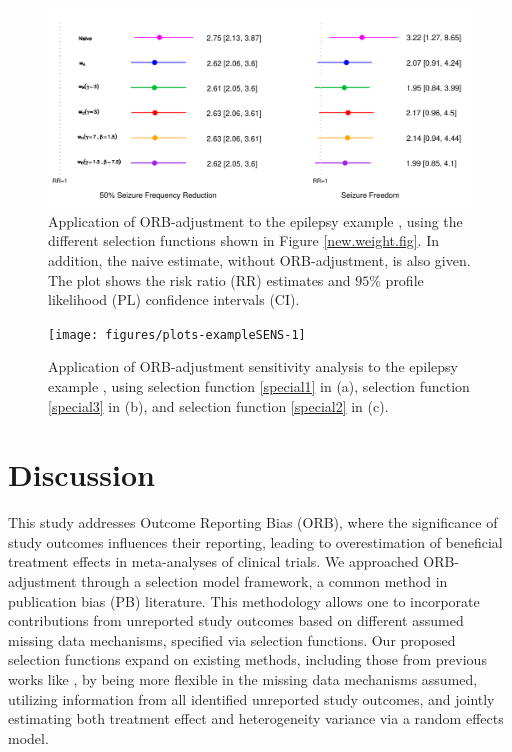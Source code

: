 \documentclass[twocolumn]{article}\usepackage[]{graphicx}\usepackage[]{xcolor}
\makeatletter
\def\maxwidth{ %
  \ifdim\Gin@nat@width>\linewidth
    \linewidth
  \else
    \Gin@nat@width
  \fi
}
\makeatother
\begin{document}
\begin{figure}[!hbt]
\centering
\caption{Application of ORB-adjustment to the epilepsy example \citep{Copas2019, topiramate}, using the different selection functions shown in Figure \ref{new.weight.fig}. In addition, the naive estimate, without ORB-adjustment, is also given. The plot shows the risk ratio (RR) estimates and $95\%$ profile likelihood (PL) confidence intervals (CI).}


{\centering \includegraphics[width=\maxwidth]{figures/plots-example-1} 

}



\label{example}
\end{figure}


\begin{figure}[!hbt]
\centering
\caption{Application of ORB-adjustment sensitivity analysis to the epilepsy example \citep{Copas2019, topiramate}, using selection function \eqref{special1} in (a), selection function \eqref{special3} in (b), and selection function \eqref{special2} in (c).\\[0.5mm]}


{\centering \texttt{[image: figures/plots-exampleSENS-1]} 

}



\label{exampleSENS}
\end{figure}

\section{Discussion} \label{disc}

This study addresses Outcome Reporting Bias (ORB), where the significance of study outcomes influences their reporting, leading to overestimation of beneficial treatment effects in meta-analyses of clinical trials. We approached ORB-adjustment through a selection model framework, a common method in publication bias (PB) literature. This methodology allows one to incorporate contributions from unreported study outcomes based on different assumed missing data mechanisms, specified via selection functions. Our proposed selection functions expand on existing methods, including those from previous works like \citet{Copas2019}, by being more flexible in the missing data mechanisms assumed, utilizing information from all identified unreported study outcomes, and jointly estimating both treatment effect and heterogeneity variance via a random effects model.
\end{document}
